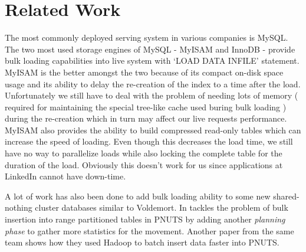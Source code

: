 \documentclass[10pt,twocolumn,preprint,natbib,authoryear]{sigplanconf}
\begin{document}
\section{Related Work}
\label{sec:related_work}
The most commonly deployed serving system in various companies is MySQL. The two most used storage engines of MySQL - MyISAM and InnoDB - provide bulk loading capabilities into live system with `LOAD DATA INFILE' statement. MyISAM is the better amongst the two because of its compact on-disk space usage and its ability to delay the re-creation of the index to a time after the load\cite{6 - http://dev.mysql.com/doc/refman/5.5/en/optimizing-myisam-bulk-data-loading.html}.  Unfortunately we still have to deal with the problem of needing lots of memory ( required for maintaining the special tree-like cache used buring bulk loading \cite{http://dev.mysql.com/doc/refman/5.1/en/server-system-variables.html-sysvar_bulk_insert_buffer_size}) during the re-creation which in turn may affect our live requests performance. MyISAM also provides the ability to build compressed read-only tables \cite{7 - http://dev.mysql.com/doc/refman/5.5/en/myisampack.html} which can increase the speed of loading. Even though this decreases the load time, we still have no way to parallelize loads while also locking the complete table for the duration of the load. Obviously this doesn't work for us since applications at LinkedIn cannot have down-time. 

A lot of work has also been done to add bulk loading ability to some new shared-nothing cluster\cite{The Case for Shared Nothing Database} databases similar to Voldemort. In \cite{8 - Efﬁcient Bulk Insertion into a Distributed Ordered Table} tackles the problem of bulk insertion into range partitioned tables in PNUTS \cite{9 - PNUTS paper} by adding another \emph {planning phase} to gather more statistics for the movement. Another paper from the same team \cite{A Batch of PNUTS: Experiences Connecting Cloud Batch and Serving Systems} shows how they used Hadoop to batch insert data faster into PNUTS.
\end{document}
